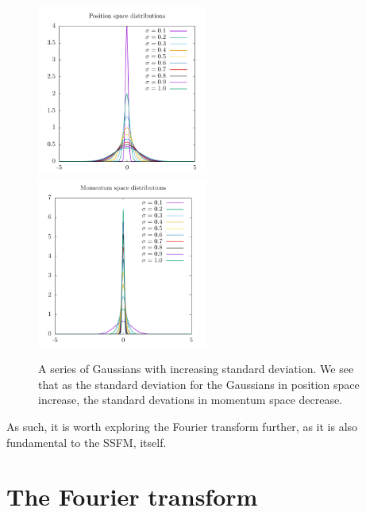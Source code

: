 \begin{figure}

\includegraphics[width = 0.5\textwidth]{data/qs/Heisenberg/position.pdf}
\includegraphics[width = 0.5\textwidth]{data/qs/Heisenberg/momentum.pdf}

\caption{A series of Gaussians with increasing standard deviation. We see that as the standard deviation for the Gaussians in position space increase, the standard devations in momentum space decrease.}
\label{fig:uncertain}
\end{figure}

As such, it is worth exploring the Fourier transform further, as it is also fundamental to the SSFM, itself.

\section{The Fourier transform}


